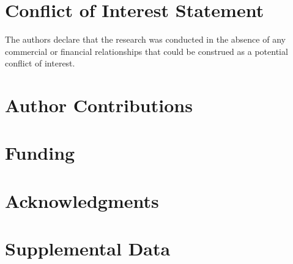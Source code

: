 \documentclass[utf8]{article}
\begin{document}





\section*{Conflict of Interest Statement}
The authors declare that the research was conducted in the absence of any commercial or financial relationships that could be construed as a potential conflict of interest.

\section*{Author Contributions}

\section*{Funding}

\section*{Acknowledgments}

\section*{Supplemental Data}
\end{document}
